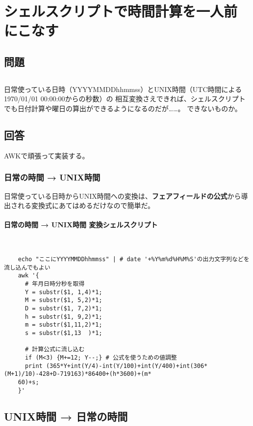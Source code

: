 \section{シェルスクリプトで時間計算を一人前にこなす}
\label{recipe:utconv}

\subsection*{問題}
\noindent
$\!\!\!\!\!$
\begin{grshfboxit}{160.0mm}
	日常使っている日時（YYYYMMDDhhmmss）とUNIX時間（UTC時間による1970/01/01 00:00:00からの秒数）の
	相互変換さえできれば、シェルスクリプトでも日付計算や曜日の算出ができるようになるのだが……。
	できないものか。
\end{grshfboxit}

\subsection*{回答}
AWKで頑張って実装する。

\subsubsection*{日常の時間 → UNIX時間}

日常使っている日時からUNIX時間への変換は、\textbf{フェアフィールドの公式}から導出される変換式にあてはめるだけなので簡単だ。
\paragraph{日常の時間 → UNIX時間 変換シェルスクリプト} 　\\
\begin{frameboxit}{160.0mm}
\begin{verbatim}
	echo "ここにYYYYMMDDhhmmss" | # date '+%Y%m%d%H%M%S'の出力文字列などを流し込んでもよい
	awk '{
	  # 年月日時分秒を取得
	  Y = substr($1, 1,4)*1;
	  M = substr($1, 5,2)*1;
	  D = substr($1, 7,2)*1;
	  h = substr($1, 9,2)*1;
	  m = substr($1,11,2)*1;
	  s = substr($1,13  )*1;

	  # 計算公式に流し込む
	  if (M<3) {M+=12; Y--;} # 公式を使うための値調整
	  print (365*Y+int(Y/4)-int(Y/100)+int(Y/400)+int(306*(M+1)/10)-428+D-719163)*86400+(h*3600)+(m*
	60)+s;
	}'
\end{verbatim}
\end{frameboxit}

\subsection*{UNIX時間 → 日常の時間}

